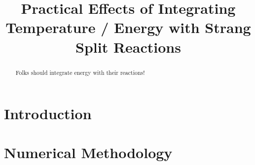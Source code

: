 \documentclass[times,modern]{aastex63}
\begin{document}
\title{Practical Effects of Integrating Temperature / Energy with Strang Split Reactions}



\shortauthors{}








\begin{abstract}
Folks should integrate energy with their reactions!
\end{abstract}


\section{Introduction}\label{Sec:Introduction}


\section{Numerical Methodology}
\end{document}
